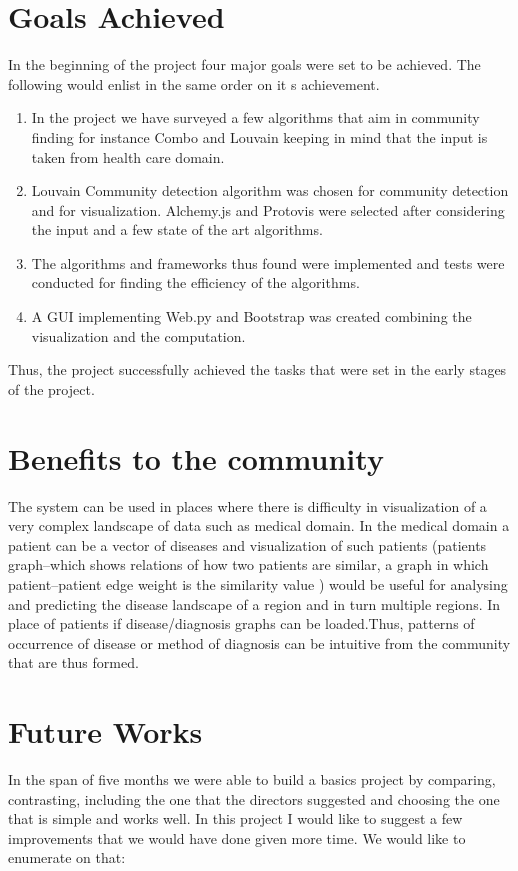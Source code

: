 \section{Goals Achieved}
In the beginning of the project four major goals were set to be achieved. The following would enlist in the same order on it s achievement.
\begin{enumerate}
\item In the project we have surveyed a few algorithms that aim in community finding for instance Combo and Louvain keeping in mind that the input is taken from health care domain. 
\item Louvain Community detection algorithm was chosen for community detection and for visualization. Alchemy.js and Protovis were selected after considering the input and a few state of the art algorithms. 
\item The algorithms and frameworks thus found were implemented and tests were conducted for finding the efficiency of the algorithms.
\item A GUI implementing Web.py and Bootstrap was created combining the visualization and the computation.
\end{enumerate}
Thus, the project successfully achieved the tasks that were set in the early stages of the project.  
\section{Benefits to the community}
The system can be used in places where there is difficulty in visualization of a very complex landscape
of data such as medical domain. In the medical domain a patient can be a vector of diseases and
visualization of such patients (patients graph–which shows relations of how two patients are
similar, a graph in which patient--patient edge weight is the similarity value ) would be useful for
analysing and predicting the disease landscape of a region and in turn multiple regions.
In place of patients if disease/diagnosis graphs can be loaded.Thus, patterns of occurrence of disease or method of diagnosis can be intuitive from the community that are thus formed. 

\section{Future Works}
In the span of five months we were able to build a basics project by comparing, contrasting, including the one that the directors suggested and choosing the one that is simple and works well. In this project I would like to suggest a few improvements that we would have done given more time. We would like to enumerate on that:

